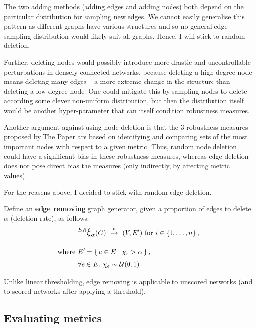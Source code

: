The two adding methods (adding edges and adding nodes) both depend on the particular distribution for sampling new edges.
We cannot easily generalise this pattern as different graphs have various structures and so no general edge sampling distribution would likely suit all graphs.
Hence, I will stick to random deletion.

Further, deleting nodes would possibly introduce more drastic and uncontrollable perturbations in densely connected networks, because deleting a high-degree node means deleting many edges -- a more extreme change in the structure than deleting a low-degree node.
One could mitigate this by sampling nodes to delete according some clever non-uniform distribution, but then the distribution itself would be another hyper-parameter that can itself condition robustness measures.

Another argument against using node deletion is that the 3 robustness measures proposed by The Paper are based on identifying and comparing sets of the most important nodes with respect to a given metric.
Thus, random node deletion could have a significant bias in these robustness measures, whereas edge deletion does not pose direct bias the measures (only indirectly, by affecting metric values).

For the reasons above, I decided to stick with random edge deletion.

\parspace

Define an \textbf{edge removing} graph generator, given a proportion of edges to delete $\alpha$ (deletion rate), as follows:
\begin{align}
    &\mathlarger{^{ER} \mathlarger{\xi}}_\alpha(G) \ \overset{n}{\hookrightarrow}\ (V, E')~\text{for}~i\in \integersto{n}, \\[10pt]
    \text{where}~&E' = \Set{ e \in E }{ \chi_e > \alpha }, \nonumber \\
    &\forall e \in E.\ \chi_e\sim\mathcal{U}(0,1) \nonumber
\end{align}


Unlike linear thresholding, edge removing is applicable to unscored networks (and to scored networks after applying a threshold).

\subsection{Evaluating metrics}

